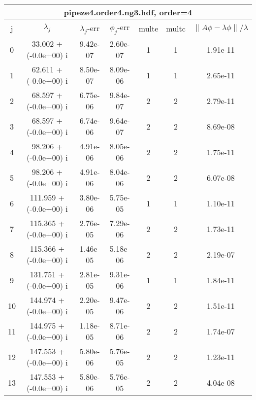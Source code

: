 \begin{table}[H]\tableFont %
\begin{center}
\begin{tabular}{|c|c|c|c|c|c|c|}  \hline
\multicolumn{7}{|c|}{pipeze4.order4.ng3.hdf, order=4} \\ \hline
   j    &         $\lambda_j$        & $\lambda_j$-err  & $\phi_j$-err  & multe & multc & $\| A\phi - \lambda\phi\|/\lambda$     \\ \hline
     0  &     33.002 + (-0.0e+00) i  &    9.42e-07      &   2.60e-07    &   1    &  1   &    1.91e-11 \\
     1  &     62.611 + (-0.0e+00) i  &    8.50e-07      &   8.09e-06    &   1    &  1   &    2.65e-11 \\
     2  &     68.597 + (-0.0e+00) i  &    6.75e-06      &   9.84e-07    &   2    &  2   &    2.79e-11 \\
     3  &     68.597 + (-0.0e+00) i  &    6.74e-06      &   9.64e-07    &   2    &  2   &    8.69e-08 \\
     4  &     98.206 + (-0.0e+00) i  &    4.91e-06      &   8.05e-06    &   2    &  2   &    1.75e-11 \\
     5  &     98.206 + (-0.0e+00) i  &    4.91e-06      &   8.04e-06    &   2    &  2   &    6.07e-08 \\
     6  &    111.959 + (-0.0e+00) i  &    3.80e-06      &   5.75e-05    &   1    &  1   &    1.10e-11 \\
     7  &    115.365 + (-0.0e+00) i  &    2.76e-05      &   7.29e-06    &   2    &  2   &    1.73e-11 \\
     8  &    115.366 + (-0.0e+00) i  &    1.46e-05      &   5.18e-06    &   2    &  2   &    2.19e-07 \\
     9  &    131.751 + (-0.0e+00) i  &    2.81e-05      &   9.31e-06    &   1    &  1   &    1.84e-11 \\
    10  &    144.974 + (-0.0e+00) i  &    2.20e-05      &   9.47e-06    &   2    &  2   &    1.51e-11 \\
    11  &    144.975 + (-0.0e+00) i  &    1.18e-05      &   8.71e-06    &   2    &  2   &    1.74e-07 \\
    12  &    147.553 + (-0.0e+00) i  &    5.80e-06      &   5.76e-05    &   2    &  2   &    1.23e-11 \\
    13  &    147.553 + (-0.0e+00) i  &    5.80e-06      &   5.76e-05    &   2    &  2   &    4.04e-08 \\

\end{tabular}
\end{center}
\end{table}
